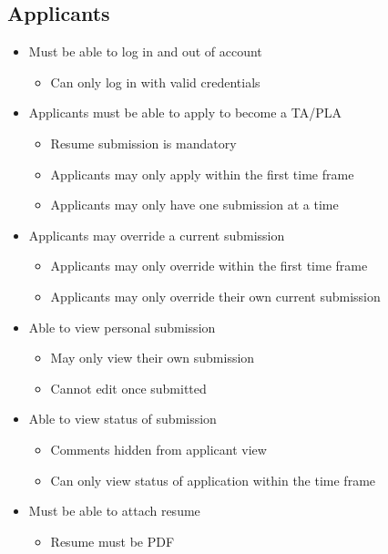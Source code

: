 \documentclass[11pt]{amsart}
\begin{document}
\subsection{Applicants}
\begin{itemize}
\item{Must be able to log in and out of account}
\begin{itemize}
\item{Can only log in with valid credentials}
\end{itemize}

\item{Applicants must be able to apply to become a TA/PLA}
\begin{itemize}
\item{Resume submission is mandatory}
\item{Applicants may only apply within the first time frame}
\item{Applicants may only have one submission at a time}
\end{itemize}

\item{Applicants may override a current submission}
\begin{itemize}
\item{Applicants may only override within the first time frame}
\item{Applicants may only override their own current submission}
\end{itemize}

\item{Able to view personal submission}
\begin{itemize}
\item{May only view their own submission}
\item{Cannot edit once submitted}
\end{itemize}

\item{Able to view status of submission}
\begin{itemize}
\item{Comments hidden from applicant view}
\item{Can only view status of application within the time frame}
\end{itemize}

\item{Must be able to attach resume}
\begin{itemize}
\item{Resume must be PDF}
\end{itemize}

\end{itemize}
\end{document}
